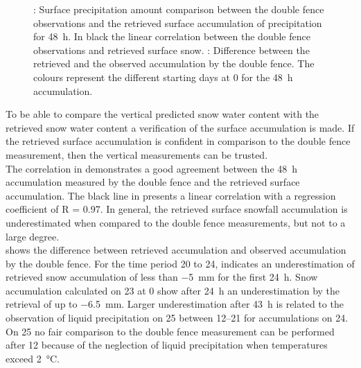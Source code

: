 \begin{figure}[t]
	\caption{\protect{}: Surface precipitation amount comparison between the double fence observations and the retrieved surface accumulation of precipitation for \SI{48}{\hour}. In black the linear correlation between the double fence observations and retrieved surface snow. 
    \protect{}: Difference between the retrieved and the observed accumulation by the double fence. The colours represent the different starting days at \SI{0}{\UTC} for the \SI{48}{\hour} accumulation.}\label{fig:res:obs_ret}
\end{figure}
To be able to compare the vertical predicted snow water content with the retrieved snow water content a verification of the surface accumulation is made. If the retrieved surface accumulation is confident in comparison to the double fence measurement, then the vertical measurements can be trusted.
\\
The correlation in  demonstrates a good agreement between the \SI{48}{\hour} accumulation measured by the double fence and the retrieved surface accumulation.
The black line in  presents a linear correlation with a regression coefficient of R = \num{0.97}. 
In general, the retrieved surface snowfall accumulation is underestimated when compared to the double fence measurements, but not to a large degree. 
\\
 shows the difference between retrieved accumulation and observed accumulation by the double fence. For the time period \num{20} to \SI{24}{\dec},  indicates an underestimation of retrieved snow accumulation of less than \SI{-5}{\mm} for the first \SI{24}{\hour}. 
Snow accumulation calculated on \SI{23}{\dec} at \SI{0}{\UTC} show after \SI{24}{\hour} an underestimation by the retrieval of up to \SI{-6.5}{\mm}. Larger underestimation after \SI{43}{\hour} is related to the observation of liquid precipitation on \SI{25}{\dec} between \SIrange{12}{21}{\UTC} for accumulations on \SI{24}{\dec}. On \SI{25}{\dec} no fair comparison to the double fence measurement can be performed after \SI{12}{\UTC} because of the neglection of liquid precipitation when temperatures exceed \SI{2}{\celsius}.
\\
